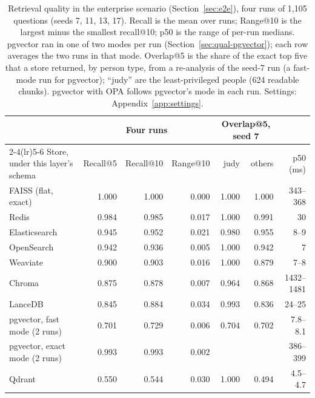 \begin{table}[tbp]
\centering
\small
\begin{tabular}{@{}lrrrrrr@{}}
\toprule
 & \multicolumn{3}{c}{Four runs} & \multicolumn{2}{c}{Overlap@5, seed 7} & \\
\cmidrule(lr){2-4}\cmidrule(lr){5-6}
Store, under this layer's schema & Recall@5 & Recall@10 & Range@10 & judy & others & p50 (ms) \\
\midrule
FAISS (flat, exact) & 1.000 & 1.000 & 0.000 & 1.000 & 1.000 & 343--368 \\
Redis & 0.984 & 0.985 & 0.017 & 1.000 & 0.991 & 30 \\
Elasticsearch & 0.945 & 0.952 & 0.021 & 0.980 & 0.955 & 8--9 \\
OpenSearch & 0.942 & 0.936 & 0.005 & 1.000 & 0.942 & 7 \\
Weaviate & 0.900 & 0.903 & 0.016 & 1.000 & 0.879 & 7--8 \\
Chroma & 0.875 & 0.878 & 0.007 & 0.964 & 0.868 & 1432--1481 \\
LanceDB & 0.845 & 0.884 & 0.034 & 0.993 & 0.836 & 24--25 \\
pgvector, fast mode (2 runs) & 0.701 & 0.729 & 0.006 & 0.704 & 0.702 & 7.8--8.1 \\
pgvector, exact mode (2 runs) & 0.993 & 0.993 & 0.002 & & & 386--399 \\
Qdrant & 0.550 & 0.544 & 0.030 & 1.000 & 0.494 & 4.5--4.7 \\
\bottomrule
\end{tabular}
\caption{Retrieval quality in the enterprise scenario (Section~\ref{sec:e2e}), four runs of 1,105
questions (seeds 7, 11, 13, 17). Recall is the mean over runs; Range@10 is the largest minus the
smallest recall@10; p50 is the range of per-run medians. pgvector ran in one of two modes per run
(Section~\ref{sec:qual-pgvector}); each row averages the two runs in that mode. Overlap@5 is the
share of the exact top five that a store returned, by person type, from a re-analysis of the seed-7
run (a fast-mode run for pgvector); ``judy'' are the least-privileged people (624 readable chunks).
pgvector with OPA follows pgvector's mode in each run. Settings: Appendix~\ref{app:settings}.}
\label{tab:qual-x0}
\end{table}

